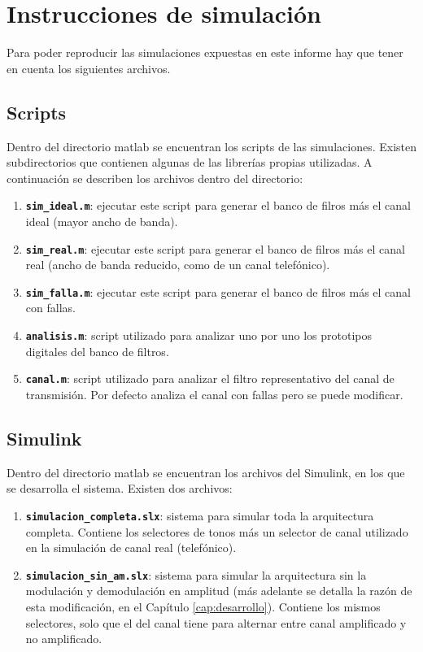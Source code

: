 \section{Instrucciones de simulación}
Para poder reproducir las simulaciones expuestas en este informe hay que tener en cuenta los siguientes archivos.

\subsection*{Scripts}
Dentro del directorio matlab se encuentran los scripts de las simulaciones. Existen subdirectorios que contienen algunas de las librerías propias utilizadas. A continuación se describen los archivos dentro del directorio:
\begin{enumerate}
  \item \textbf{\lstinline{sim_ideal.m}}: ejecutar este script para generar el banco de filros más el canal ideal (mayor ancho de banda).
  \item \textbf{\lstinline{sim_real.m}}: ejecutar este script para generar el banco de filros más el canal real (ancho de banda reducido, como de un canal telefónico).
  \item \textbf{\lstinline{sim_falla.m}}: ejecutar este script para generar el banco de filros más el canal con fallas.
  \item \textbf{\lstinline{analisis.m}}: script utilizado para analizar uno por uno los prototipos digitales del banco de filtros.
  \item \textbf{\lstinline{canal.m}}: script utilizado para analizar el filtro representativo del canal de transmisión. Por defecto analiza el canal con fallas pero se puede modificar.
\end{enumerate}

\subsection*{Simulink}
Dentro del directorio matlab se encuentran los archivos del Simulink, en los que se desarrolla el sistema. Existen dos archivos:
\begin{enumerate}
  \item \textbf{\lstinline{simulacion_completa.slx}}: sistema para simular toda la arquitectura completa. Contiene los selectores de tonos más un selector de canal utilizado en la simulación de canal real (telefónico).
  \item \textbf{\lstinline{simulacion_sin_am.slx}}: sistema para simular la arquitectura sin la modulación y demodulación en amplitud (más adelante se detalla la razón de esta modificación, en el Capítulo \ref{cap:desarrollo}). Contiene los mismos selectores, solo que el del canal tiene para alternar entre canal amplificado y no amplificado.
\end{enumerate}